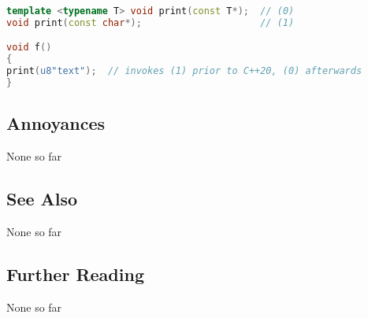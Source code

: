 \begin{lstlisting}[language=C++, basicstyle={\ttfamily\footnotesize}]
template <typename T> void print(const T*);  // (0)
void print(const char*);                     // (1)

void f()
{
print(u8"text");  // invokes (1) prior to C++20, (0) afterwards
}
\end{lstlisting}


\subsection[Annoyances]{Annoyances}\label{annoyances}

None so far

\subsection[See Also]{See Also}\label{see-also}

None so far

\subsection[Further Reading]{Further Reading}\label{further-reading}

None so far

